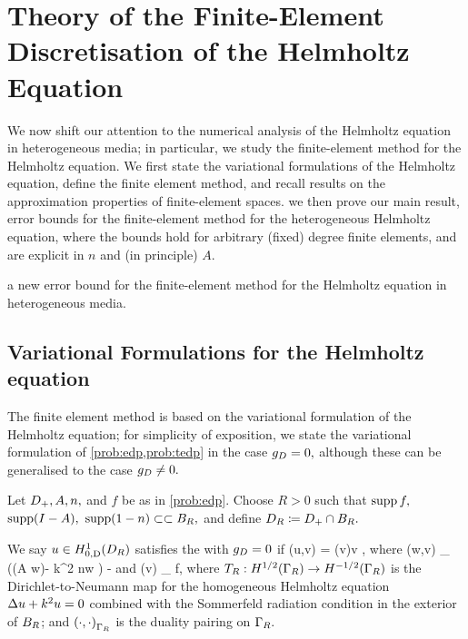 \section{Theory of the Finite-Element Discretisation of the Helmholtz Equation}\label{sec:helmfe}

We now shift our attention to the numerical analysis of the Helmholtz equation in heterogeneous media; in particular, we  study the finite-element method for the Helmholtz equation. We first state the variational formulations of the Helmholtz equation, define the finite element method, and recall results on the approximation properties of finite-element spaces. we then prove our main result, error bounds for the finite-element method for the heterogeneous Helmholtz equation, where the bounds hold for arbitrary (fixed) degree finite elements, and are explicit in $n$ and (in principle) $A$.

a new error bound for the finite-element method for the Helmholtz equation in heterogeneous media.

  \subsection{Variational Formulations for the Helmholtz equation}\label{sec:varform}
  The finite element method is based on the variational formulation of the Helmholtz equation; for simplicity of exposition, we state the variational formulation of \cref{prob:edp,prob:tedp} in the case $g_{D} = 0,$ although these can be generalised to the case $g_{D} \neq 0.$
  
\bprob[Variational formulation of EDP when $\gD = 0$]\label{prob:vedp}
Let $D_{+}, A, n,$ and $f$ be as in \cref{prob:edp}. Choose $R>0$ such that $\operatorname{supp} f,$ $\operatorname{supp}(I-A),$ $\operatorname{supp}(1-n) \subset\subset B_{R},$ and define $D_{R} \coloneqq D_{+} \cap B_{R}.$

We say $u \in \HozDDR$ satisfies the  with $\gD = 0$ if
\beqs
\aE(u,v) = \FE(v)\quad \tfa v \in \HozDDR,
\eeqs
where
\beqs
\aE(w,v) \de \int_{\DR} \mleft(\mleft(A \grad w\mright)\cdot\grad \vbar - k^2 n\minispace w \vbar\mright) - 
\eeqs
and
\beqs
\FE(v) \de \int_{\DR} f\minispace\vbar,
\eeqs
where $\DtN:\HhGR\rightarrow \HmhGR$ is the Dirichlet-to-Neumann map for the homogeneous Helmholtz equation $\Delta u + k^2 u = 0$ combined with the Sommerfeld radiation condition in the exterior of $B_{R}$; and $\DPGR{\cdot}{\cdot}$ is the duality pairing on $\Gamma_{R}.$
\eprob

